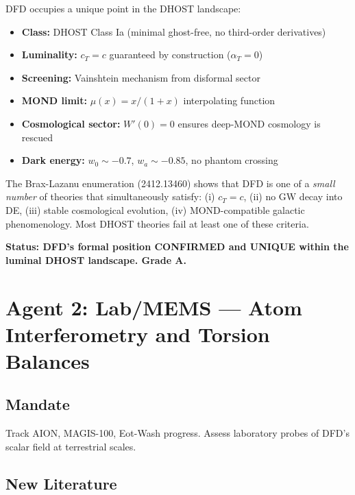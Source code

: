\documentclass[11pt,a4paper]{article}
\begin{document}
DFD occupies a unique point in the DHOST landscape:
\begin{itemize}
\item \textbf{Class:} DHOST Class Ia (minimal ghost-free, no third-order derivatives)
\item \textbf{Luminality:} $c_T = c$ guaranteed by construction ($\alpha_T = 0$)
\item \textbf{Screening:} Vainshtein mechanism from disformal sector
\item \textbf{MOND limit:} $\mu(x) = x/(1+x)$ interpolating function
\item \textbf{Cosmological sector:} $W'(0) = 0$ ensures deep-MOND cosmology is rescued
\item \textbf{Dark energy:} $w_0 \sim -0.7$, $w_a \sim -0.85$, no phantom crossing
\end{itemize}

The Brax-Lazanu enumeration (2412.13460) shows that DFD is one of a \emph{small number} of theories that simultaneously satisfy:
(i) $c_T = c$, (ii) no GW decay into DE, (iii) stable cosmological evolution, (iv) MOND-compatible galactic phenomenology. Most DHOST theories fail at least one of these criteria.

\textbf{Status: DFD's formal position CONFIRMED and UNIQUE within the luminal DHOST landscape. Grade A.}

\section{Agent 2: Lab/MEMS --- Atom Interferometry and Torsion Balances}

\subsection{Mandate}
Track AION, MAGIS-100, Eot-Wash progress. Assess laboratory probes of DFD's scalar field at terrestrial scales.

\subsection{New Literature}
\end{document}

